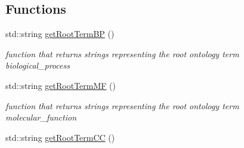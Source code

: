 \subsection*{Functions}
\begin{DoxyCompactItemize}
\item 
std\+::string \hyperlink{namespaceGO_a01b8a816fd68f54681d8ea9b8f9e6dea}{get\+Root\+Term\+BP} ()\hypertarget{namespaceGO_a01b8a816fd68f54681d8ea9b8f9e6dea}{}\label{namespaceGO_a01b8a816fd68f54681d8ea9b8f9e6dea}

\begin{DoxyCompactList}\small\item\em function that returns strings representing the root ontology term biological\+\_\+process \end{DoxyCompactList}\item 
std\+::string \hyperlink{namespaceGO_ab312ff138d3e84313829ceafcf38b4a8}{get\+Root\+Term\+MF} ()\hypertarget{namespaceGO_ab312ff138d3e84313829ceafcf38b4a8}{}\label{namespaceGO_ab312ff138d3e84313829ceafcf38b4a8}

\begin{DoxyCompactList}\small\item\em function that returns strings representing the root ontology term molecular\+\_\+function \end{DoxyCompactList}\item 
std\+::string \hyperlink{namespaceGO_a8d9026b41aa1cb1aa042b17a86c45903}{get\+Root\+Term\+CC} ()\hypertarget{namespaceGO_a8d9026b41aa1cb1aa042b17a86c45903}{}\label{namespaceGO_a8d9026b41aa1cb1aa042b17a86c45903}


\end{DoxyCompactItemize}
